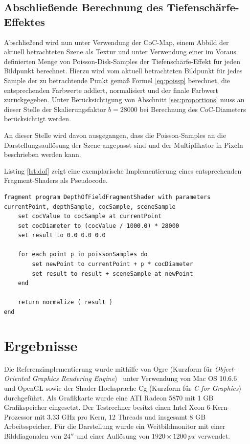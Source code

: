 \documentclass{acmsiggraph}                     %
\begin{document}
\subsection{Abschließende Berechnung des Tiefenschärfe-Effektes}

Abschließend wird nun unter Verwendung der CoC-Map, einem Abbild der aktuell betrachteten Szene als Textur und unter Verwendung einer im Voraus definierten Menge von Poisson-Disk-Samples der Tiefenschärfe-Effekt für jeden Bildpunkt berechnet. Hierzu wird vom aktuell betrachteten Bildpunkt für jedes Sample der zu betrachtende Punkt gemäß Formel \ref{eq:poissp} berechnet, die entsprechenden Farbwerte addiert, normalisiert und der finale Farbwert zurückgegeben. Unter Berücksichtigung von Abschnitt \ref{sec:proportions} muss an dieser Stelle der Skalierungsfaktor $b = 28000$ bei Berechnung des CoC-Diameters berücksichtigt werden.

An dieser Stelle wird davon ausgegangen, dass die Poisson-Samples an die Darstellungsauflösung der Szene angepasst sind und der Multiplikator in Pixeln beschrieben werden kann.

Listing \ref{lst:dof} zeigt eine exemplarische Implementierung eines entsprechenden Fragment-Shaders als Pseudocode.

\begin{lstlisting}[caption=Pseudocode für den Fragment-Shader zur Berechnung der Tiefenschärfe.,language=pseudo,label={lst:dof}]
fragment program DepthOfFieldFragmentShader with parameters currentPoint, depthSample, cocSample, sceneSample
	set cocValue to cocSample at currentPoint
	set cocDiameter to (cocValue / 1000.0) * 28000
	set result to 0.0 0.0 0.0

	for each point p in poissonSamples do
		set newPoint to currentPoint + p * cocDiameter
		set result to result + sceneSample at newPoint
	end
	
	return normalize ( result )
end
\end{lstlisting}

\section{Ergebnisse}

Die Referenzimplementierung wurde mithilfe von Ogre (Kurzform für \emph{Object-Oriented Graphics Rendering Engine})~\cite{Torus:2011vn} unter Verwendung von Mac OS 10.6.6 und OpenGL sowie der Shader-Hochsprache Cg (Kurzform für \emph{C for Graphics}) durchgeführt. Als Grafikkarte wurde eine ATI Radeon 5870 mit 1 GB Grafikspeicher eingesetzt. Der Testrechner besitzt einen Intel Xeon 6-Kern-Prozessor mit 3.33 GHz pro Kern, 12 Threads und insgesamt 8 GB Arbeitsspeicher. Für die Darstellung wurde ein Weitbildmonitor mit einer Bilddiagonalen von $24''$ und einer Auflösung von $1920\times\SI{1200}{px}$ verwendet.
\end{document}
